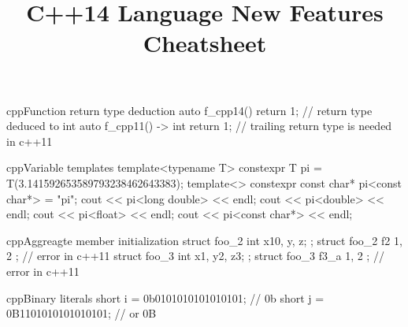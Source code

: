 \documentclass[10pt,a4paper]{article}
\title{\color{w3schools}C++14 Language New Features Cheatsheet
}
\begin{document}
\maketitle
\small
\begin{multicols}{3}

\thispagestyle{empty}
\scriptsize

% 




\begin{codebox}{cpp}{Function return type deduction}
auto f_cpp14() { return 1; } // return type deduced to int
auto f_cpp11() -> int { return 1; } // trailing return type is needed in c++11

\end{codebox}

\begin{codebox}{cpp}{Variable templates}
template<typename T>
constexpr T pi = T(3.141592653589793238462643383);
template<>
constexpr const char* pi<const char*> = "pi";
cout << pi<long double> << endl;
cout << pi<double> << endl;
cout << pi<float> << endl;
cout << pi<const char*> << endl;

\end{codebox}

\begin{codebox}{cpp}{Aggreagte member initialization}
struct foo_2 {
  int x{10}, y, z;
};
struct foo_2 f2 { 1, 2 }; // error in c++11
struct foo_3 {
  int x{1}, y{2}, z{3};
};
struct foo_3 f3_a { 1, 2 }; // error in c++11

\end{codebox}

\begin{codebox}{cpp}{Binary literals}
short i = 0b0101010101010101; // 0b
short j = 0B1101010101010101; // or 0B


\end{codebox}
\end{multicols}
\end{document}
